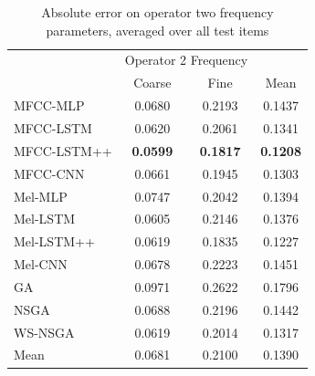 \begin{table}[ht]
\centering
\begin{tabular}{l|cc|c}
\toprule
{} & \multicolumn{2}{c}{Operator 2 Frequency} & {} \\
{} & Coarse & Fine & Mean \\
\midrule
MFCC-MLP    &    0.0680 &  0.2193 & 0.1437 \\
MFCC-LSTM   &    0.0620 &  0.2061 & 0.1341 \\
MFCC-LSTM++ &    \textbf{0.0599} &  \textbf{0.1817} & \textbf{0.1208} \\
MFCC-CNN    &    0.0661 &  0.1945 & 0.1303 \\
\midrule
Mel-MLP     &    0.0747 &  0.2042 & 0.1394 \\
Mel-LSTM    &    0.0605 &  0.2146 & 0.1376 \\
Mel-LSTM++  &    0.0619 &  0.1835 & 0.1227 \\
Mel-CNN     &    0.0678 &  0.2223 & 0.1451 \\
\midrule
GA          &    0.0971 &  0.2622 & 0.1796 \\
NSGA        &    0.0688 &  0.2196 & 0.1442 \\
WS-NSGA     &    0.0619 &  0.2014 & 0.1317 \\
\midrule
Mean        &    0.0681 &  0.2100 & 0.1390 \\
\bottomrule
\end{tabular}
\caption{Absolute error on operator two frequency parameters, averaged over all test items}
\label{tbl:param_eval_osc}
\end{table}


